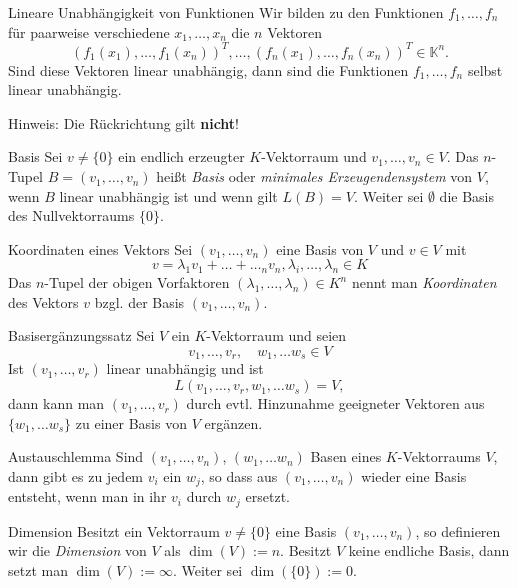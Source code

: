 \documentclass[german]{../spicker}
\begin{document}
\begin{bonus}{Lineare Unabhängigkeit von Funktionen}
    Wir bilden zu den Funktionen $f_1, \ldots, f_n$ für paarweise verschiedene $x_1, \ldots, x_n$ die $n$ Vektoren
    $$
        (f_1(x_1), \ldots, f_1(x_n))^T, \ldots, (f_n(x_1), \ldots, f_n(x_n))^T \in \mathbb{K}^n.
    $$
    Sind diese Vektoren linear unabhängig, dann sind die Funktionen $f_1, \ldots, f_n$ selbst linear unabhängig.

    Hinweis: Die Rückrichtung gilt \textbf{nicht}!
\end{bonus}

\begin{defi}{Basis}
    Sei $v \neq \{0\}$ ein endlich erzeugter $K$-Vektorraum und $v_1, \ldots, v_n \in V$. Das $n$-Tupel $B = (v_1, \ldots, v_n)$ heißt \emph{Basis} oder \emph{minimales Erzeugendensystem} von $V$, wenn $B$ linear unabhängig ist und wenn gilt $L(B) = V$.
    Weiter sei $\emptyset$ die Basis des Nullvektorraums $\{0\}$.
\end{defi}

\begin{bonus}{Koordinaten eines Vektors}
    Sei $(v_1, \ldots, v_n)$ eine Basis von $V$ und $v \in V$ mit
    $$
        v = \lambda_1v_1 + \ldots + \ldots_nv_n, \lambda_i, \ldots, \lambda_n \in K
    $$
    Das $n$-Tupel der obigen Vorfaktoren $(\lambda_1, \ldots, \lambda_n) \in K^n$ nennt man \emph{Koordinaten} des Vektors $v$ bzgl. der Basis $(v_1, \ldots, v_n)$.
\end{bonus}

\begin{defi}{Basisergänzungssatz}
    Sei $V$ ein $K$-Vektorraum und seien
    $$
        v_1, \ldots, v_r, \quad w_1, \ldots w_s \in V
    $$
    Ist $(v_1, \ldots, v_r)$ linear unabhängig und ist
    $$
        L(v_1, \ldots, v_r, w_1, \ldots w_s) = V,
    $$
    dann kann man $(v_1, \ldots, v_r)$ durch evtl. Hinzunahme geeigneter Vektoren aus $\{w_1, \ldots w_s\}$ zu einer Basis von $V$ ergänzen.
\end{defi}

\begin{defi}{Austauschlemma}
    Sind $(v_1, \ldots, v_n)$, $(w_1, \ldots w_n)$ Basen eines $K$-Vektorraums $V$, dann gibt es zu jedem $v_i$ ein $w_j$, so dass aus $(v_1, \ldots, v_n)$ wieder eine Basis entsteht, wenn man in ihr $v_i$ durch $w_j$ ersetzt.
\end{defi}

\begin{defi}{Dimension}
    Besitzt ein Vektorraum $v \neq \{0\}$ eine Basis $(v_1, \ldots, v_n)$, so definieren wir die \emph{Dimension} von $V$ als $\dim(V) := n$.
    Besitzt $V$ keine endliche Basis, dann setzt man $\dim(V) := \infty$. Weiter sei $\dim(\{0\}) := 0$.
\end{defi}
\end{document}
